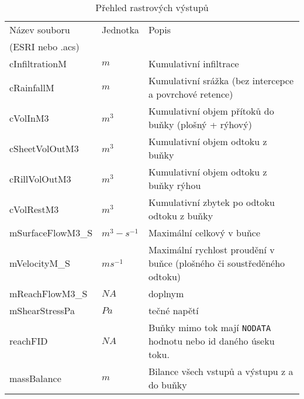 

\begin{table}[h!]
 

 \centering
 \caption{Přehled rastrových výstupů}
\label{tab:vystupyrast}

 \begin{tabular}{llp{}}
 \hline
  Název souboru    & Jednotka    & Popis       \\ 
  (ESRI nebo .acs)    &     &        \\ \hline \hline
  cInfiltrationM     &   $m$        & Kumulativní infiltrace \\
  cRainfallM       &  $m$  &  Kumulativní srážka (bez intercepce a povrchové retence) \\
  cVolInM3       &  $m^3$  & Kumulativní objem přítoků do buňky  (plošný + rýhový) \\
  cSheetVolOutM3       &  $m^3$  & Kumulativní objem odtoku z buňky \\
  cRillVolOutM3       &  $m^3$  & Kumulativní objem odtoku z buňky rýhou \\
  cVolRestM3      &  $m^3$  & Kumulativní zbytek po odtoku odtoku z buňky\\
  mSurfaceFlowM3\_S  &   $m^3-s^{-1}$	&  Maximální celkový v buňce\\
  mVelocityM\_S	&   $ms^{-1}$	&  Maximální rychlost proudění v buňce (plošného či soustředěného odtoku) \\
  mReachFlowM3\_S   &  $NA$ & doplnym  \\
  mShearStressPa   & $Pa$ &  tečné napětí \\
  reachFID   &  $NA$ &  Buňky mimo tok mají {\tt NODATA} hodnotu nebo id daného úseku toku.  \\
  massBalance   &   $m$  &  Bilance všech vstupů a výstupu z a do buňky  \\
  \hline

 \end{tabular}
 

\end{table}





